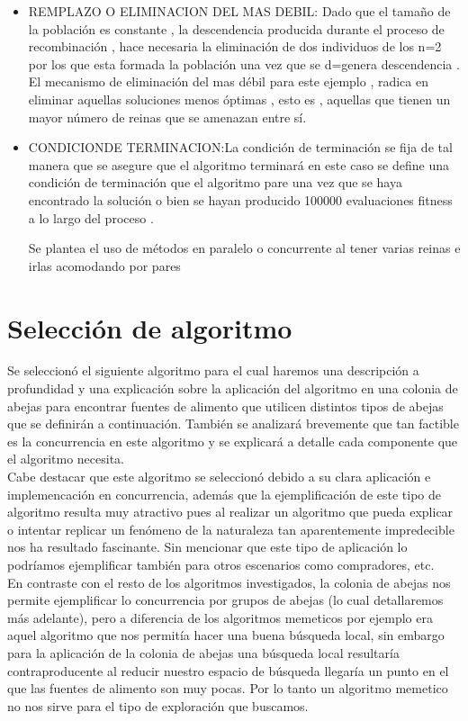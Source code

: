 \documentclass{article}
\begin{document}
\begin{itemize}
    \item REMPLAZO O ELIMINACION DEL MAS DEBIL: Dado que el tamaño de la población es constante , la descendencia producida durante el proceso de recombinación , hace necesaria la eliminación de dos individuos de los n=2 por los que esta formada la población una vez que se d=genera descendencia . El mecanismo de eliminación del mas débil para este ejemplo , radica en eliminar aquellas soluciones menos óptimas , esto es , aquellas que tienen un mayor número de reinas que se amenazan entre sí. 

    \item CONDICIONDE TERMINACION:La condición de terminación se fija de tal manera que se asegure que el algoritmo terminará en este caso se define una condición de terminación que el algoritmo pare una vez que se haya encontrado la solución o bien se hayan producido 100000 evaluaciones fitness a lo largo del proceso .

Se plantea el uso de  métodos en paralelo o concurrente al tener varias reinas e irlas acomodando por pares
\end{itemize}

\section{Selección de algoritmo}

Se seleccionó el siguiente algoritmo para el cual haremos una descripción a profundidad y una explicación sobre la aplicación del algoritmo en una colonia de abejas para encontrar fuentes de alimento que utilicen distintos tipos de abejas que se definirán a continuación. También se analizará brevemente que tan factible es la concurrencia en este algoritmo y se explicar\'a a detalle cada componente que el algoritmo necesita.\\

Cabe destacar que este algoritmo se seleccion\'o debido a su clara aplicación e implemencaci\'on en concurrencia, además que la ejemplificación de este tipo de algoritmo resulta muy atractivo pues al realizar un algoritmo que pueda explicar o intentar replicar un fenómeno de la naturaleza tan aparentemente impredecible nos ha resultado fascinante. Sin mencionar que este tipo de aplicaci\'on lo podríamos ejemplificar también  para otros escenarios como compradores, etc.\\

En contraste con el resto de los algoritmos investigados, la colonia de abejas nos permite ejemplificar lo concurrencia por grupos de abejas (lo cual detallaremos más adelante), pero a diferencia de los algoritmos memeticos por ejemplo era aquel algoritmo que nos permitía hacer una buena búsqueda local, sin embargo para la aplicaci\'on de la colonia de abejas una búsqueda local resultaría contraproducente al reducir nuestro espacio de búsqueda llegaría un punto en el que las fuentes de alimento son muy pocas. Por lo tanto un algoritmo memetico no nos sirve para el tipo de exploración que buscamos.\\
\end{document}
